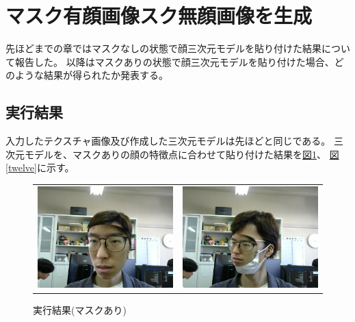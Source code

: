\documentclass[]{jarticle}          %
\begin{document}
\section{マスク有顔画像スク無顔画像を生成}
先ほどまでの章ではマスクなしの状態で顔三次元モデルを貼り付けた結果について報告した。
以降はマスクありの状態で顔三次元モデルを貼り付けた場合、どのような結果が得られたか発表する。
\subsection{実行結果}
入力したテクスチャ画像及び作成した三次元モデルは先ほどと同じである。
三次元モデルを、マスクありの顔の特徴点に合わせて貼り付けた結果を\hyperref[eleven]{図\ref{eleven}}、
\hyperref[twelve]{図\ref{twelve}}に示す。
\begin{figure}[!ht]
  \begin{tabular}{cc}
    \begin{minipage}[t]{0.45\hsize}
      \centering
      \includegraphics[keepaspectratio, scale=0.3]{figures/output5.png}
      \caption{実行結果(マスクあり)}
      \label{eleven}
    \end{minipage} &
    \begin{minipage}[t]{0.45\hsize}
      \centering
      \includegraphics[keepaspectratio, scale=0.3]{figures/output6.png}

\end{minipage}
\end{tabular}
\end{figure}
\end{document}
